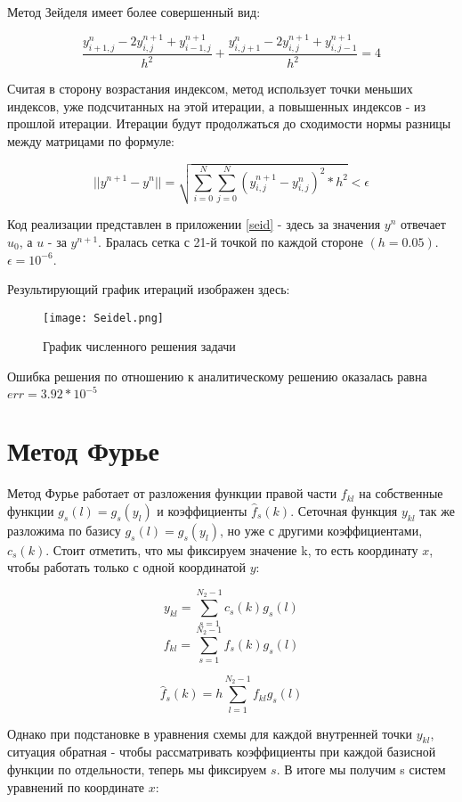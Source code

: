 Метод Зейделя имеет более совершенный вид:

\[ \frac{y_{i + 1, j}^n - 2y_{i, j}^{n+1} + y_{i - 1, j}^{n+1}}{h^2} + \frac{y_{i, j + 1}^{n} - 2y_{i, j}^{n+1} + y_{i, j - 1}^{n+1}}{h^2} = 4 \]

Считая в сторону возрастания индексом, метод использует точки меньших индексов, уже подсчитанных на этой итерации, а повышенных индексов - из прошлой итерации. Итерации будут продолжаться до сходимости нормы разницы между матрицами по формуле:

\[ ||y^{n+1} - y^{n}|| = \sqrt{\sum_{i=0}^{N}\sum_{j=0}^{N}(y^{n+1}_{i,j} - y^{n}_{i,j})^2 * h^2} < \epsilon  \] 

Код реализации представлен в приложении \ref{seid} - здесь за значения $y^{n}$ отвечает $u_0$, а $u$ - за $y^{n+1}$. Бралась сетка с 21-й точкой по каждой стороне $(h=0.05)$. $\epsilon = 10^{-6}$.

Результирующий график итераций изображен здесь:

\begin{figure}[h]
\centering
\texttt{[image: Seidel.png]}
\caption{График численного решения задачи}
\end{figure}

Ошибка решения по отношению к аналитическому решению оказалась равна $err = 3.92 * 10^{-5}$


\newpage
\section{Метод Фурье}

Метод Фурье работает от разложения функции правой части $f_{kl}$ на собственные функции $g_s(l) = g_s(y_l)$ и коэффициенты $\hat f_s(k)$.
Сеточная функция $y_{kl}$ так же разложима по базису $g_s(l) = g_s(y_l)$, но уже с другими коэффициентами, $c_s(k)$.
Стоит отметить, что мы фиксируем значение k, то есть координату $x$, чтобы работать только с одной координатой $y$:

\[ y_{kl} = \sum_{s=1}^{N_2-1}c_s(k)g_s(l) \]
\[ f_{kl} = \sum_{s=1}^{N_2-1} \hat f_s(k) g_s(l) \]

\[ \hat f_s(k) = h \sum_{l=1}^{N_2-1}f_{kl}g_s(l) \]

Однако при подстановке в уравнения схемы для каждой внутренней точки $y_{kl}$, ситуация обратная - чтобы рассматривать коэффициенты при каждой базисной функции по отдельности, теперь мы фиксируем $s$.
В итоге мы получим s систем уравнений по координате $x$:

